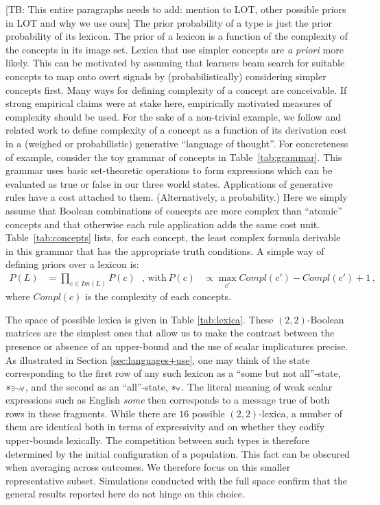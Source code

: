 \documentclass[a4paper]{article}
\newcommand{\tb}[1]{\textcolor[rgb]{.8,.33,.0}{[TB: #1]}}%
\newcommand{\state}{\ensuremath{s}\xspace}		%
\newcommand{\mystate}[1]{\ensuremath{\state_{\text{#1}}}\xspace} %
\newcommand{\ssome}{\mystate{\ensuremath{\exists\neg\forall}}}
\newcommand{\sall}{\mystate{\ensuremath{\forall}}}
\begin{document}
\tb{This entire paragraphs needs to add: mention to LOT, other possible priors in LOT and why we use ours} The prior probability of a type is just the prior probability of its lexicon. The prior of a
lexicon is a function of the complexity of the concepts in its image set. Lexica that use
simpler concepts are \emph{a priori} more likely. This can be motivated by assuming that
learners beam search for suitable concepts to map onto overt signals by (probabilistically)
considering simpler concepts first. Many ways for defining complexity of a concept are
conceivable. If strong empirical claims were at stake here, empirically motivated measures of
complexity should be used. For the sake of a non-trivial example, we follow
\citet{piantadosi+etal:underreview} and related work to define complexity of a concept as a
function of its derivation cost in a (weighed or probabilistic) generative ``language of
thought''. For concreteness of example, consider the toy grammar of concepts in
Table~\ref{tab:grammar}. This grammar uses basic set-theoretic operations to form expressions
which can be evaluated as true or false in our three world states. Applications of generative
rules have a cost attached to them. (Alternatively, a probability.) Here we simply assume that
Boolean combinations of concepts are more complex than ``atomic'' concepts and that otherwise
each rule application adds the same cost unit. Table~\ref{tab:concepts} lists, for each
concept, the least complex formula derivable in this grammar that has the appropriate truth
conditions. A simple way of defining priors over a lexicon is:
\begin{align*}
  P(L)  & = \prod_{c \in Im(L)} P(c)  \ \ \ \text{, with} & 
  P(c) & \propto \max_{c'}Compl(c') - Compl(c') + 1\,,
\end{align*}
where $Compl(c)$ is the complexity of each concepts. 

The space of possible lexica is given in Table \ref{tab:lexica}. These $(2,2)$-Boolean matrices are the simplest ones that allow us to make the contrast between the presence or absence of an upper-bound and the use of scalar implicatures precise. As illustrated in Section \ref{sec:languages+use}, one may think of the state corresponding to the first row of any such lexicon as a ``some but not all''-state, $\ssome$, and the second as an ``all''-state, $\sall$. The literal meaning of weak scalar expressions such as English {\em some} then corresponds to a message true of both rows in these fragments. While there are $16$ possible $(2,2)$-lexica, a number of them are identical both in terms of expressivity and on whether they codify upper-bounds lexically. The competition between such types is therefore determined by the initial configuration of a population. This fact can be obscured when averaging across outcomes. We therefore focus on this smaller representative subset. Simulations conducted with the full space confirm that the general results reported here do not hinge on this choice.
\end{document}
